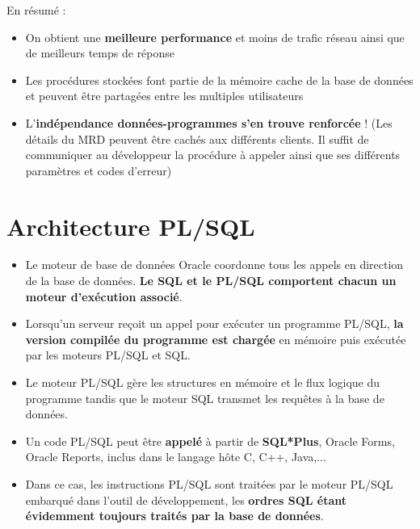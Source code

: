 \documentclass[10pt]{beamer}
\begin{document}
\begin{frame}[allowframebreaks]{\secname}
    En résumé :
    \begin{itemize}
        \item On obtient une \textbf{meilleure performance} et moins de trafic réseau ainsi que de meilleurs temps de réponse
        \item Les procédures stockées font partie de la mémoire cache de la base de données et peuvent être partagées entre les multiples utilisateurs
        \item L'\textbf{indépendance données-programmes s'en trouve renforcée} ! (Les détails du MRD peuvent être cachés aux différents clients.  Il suffit de communiquer au développeur la procédure à appeler ainsi que ses différents paramètres et codes d'erreur)
    \end{itemize}
\end{frame}

\section{Architecture PL/SQL}
\begin{frame}{\secname}
    \begin{itemize}
        \item Le moteur de base de données Oracle coordonne tous les appels en direction de la base de données. \textbf{Le SQL et le PL/SQL comportent chacun un moteur d'exécution associé}.
        \item Lorsqu'un serveur reçoit un appel pour exécuter un programme PL/SQL, \textbf{la version compilée du programme est chargée} en mémoire puis exécutée par les moteurs PL/SQL et SQL.
        \item Le moteur PL/SQL gère les structures en mémoire et le flux logique du programme tandis que le moteur SQL transmet les requêtes à la base de données.
    \end{itemize}
\end{frame}

\begin{frame}{\secname}
    \begin{itemize}
        \item Un code PL/SQL peut être \textbf{appelé} à partir de \textbf{SQL*Plus}, Oracle Forms, Oracle Reports, inclus dans le langage hôte C, C++, Java,...
        \item Dans ce cas, les instructions PL/SQL sont traitées par le moteur PL/SQL embarqué dans l'outil de développement, les \textbf{ordres SQL étant évidemment toujours traités par la base de données}.
    \end{itemize}
\end{frame}


\end{document}
